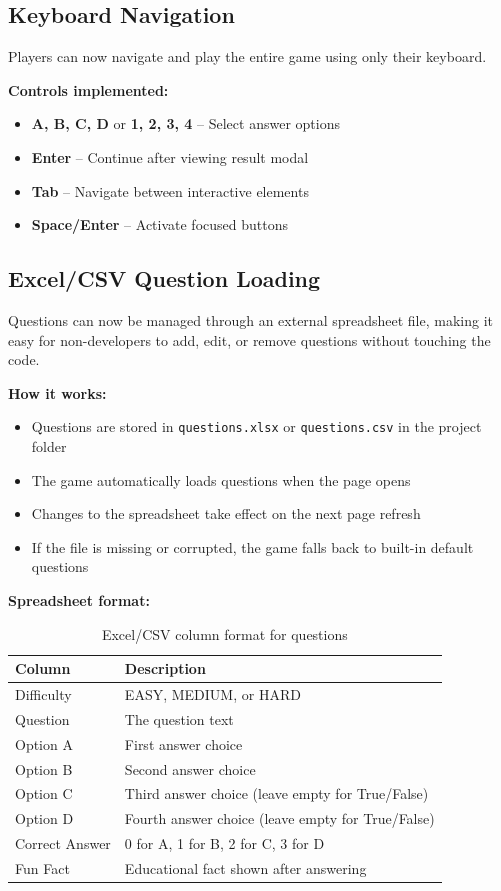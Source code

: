 \documentclass[11pt,a4paper]{article}
\begin{document}
\subsection{Keyboard Navigation}

Players can now navigate and play the entire game using only their keyboard.

\textbf{Controls implemented:}
\begin{itemize}
    \item \textbf{A, B, C, D} or \textbf{1, 2, 3, 4} -- Select answer options
    \item \textbf{Enter} -- Continue after viewing result modal
    \item \textbf{Tab} -- Navigate between interactive elements
    \item \textbf{Space/Enter} -- Activate focused buttons
\end{itemize}

\subsection{Excel/CSV Question Loading}

Questions can now be managed through an external spreadsheet file, making it easy for non-developers to add, edit, or remove questions without touching the code.

\textbf{How it works:}
\begin{itemize}
    \item Questions are stored in \texttt{questions.xlsx} or \texttt{questions.csv} in the project folder
    \item The game automatically loads questions when the page opens
    \item Changes to the spreadsheet take effect on the next page refresh
    \item If the file is missing or corrupted, the game falls back to built-in default questions
\end{itemize}

\textbf{Spreadsheet format:}
\begin{table}[h]
\centering
\small
\begin{tabular}{@{}ll@{}}
\toprule
\textbf{Column} & \textbf{Description} \\
\midrule
Difficulty & EASY, MEDIUM, or HARD \\
Question & The question text \\
Option A & First answer choice \\
Option B & Second answer choice \\
Option C & Third answer choice (leave empty for True/False) \\
Option D & Fourth answer choice (leave empty for True/False) \\
Correct Answer & 0 for A, 1 for B, 2 for C, 3 for D \\
Fun Fact & Educational fact shown after answering \\
\bottomrule
\end{tabular}
\caption{Excel/CSV column format for questions}
\end{table}
\end{document}
